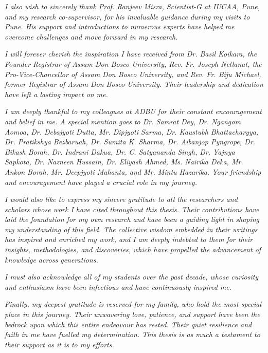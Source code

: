 \begin{titlepage}
    \par\textsl{I also wish to sincerely thank Prof. Ranjeev Misra, Scientist-G at IUCAA, Pune, and my research co-supervisor, for his invaluable guidance during my visits to Pune. His support and introductions to numerous experts have helped me overcome challenges and move forward in my research.}
    
    \par\textsl{I will forever cherish the inspiration I have received from Dr. Basil Koikara, the Founder Registrar of Assam Don Bosco University, Rev. Fr. Joseph Nellanat, the Pro-Vice-Chancellor of Assam Don Bosco University, and Rev. Fr. Biju Michael, former Registrar of Assam Don Bosco University. Their leadership and dedication have left a lasting impact on me.}
    
    \par\textsl{I am deeply thankful to my colleagues at ADBU for their constant encouragement and belief in me. A special mention goes to Dr. Samrat Dey, Dr. Ngangom Aomoa, Dr. Debajyoti Dutta, Mr. Dipjyoti Sarma, Dr. Kaustubh Bhattacharyya, Dr. Pratikshya Bezbaruah, Dr. Sumita K. Sharma, Dr. Aibanjop Pyngrope, Dr. Bikash Borah, Dr. Indrani Dakua, Dr. C. Satyananda Singh, Dr. Yajnya Sapkota, Dr. Nazneen Hussain, Dr. Eliyash Ahmed, Ms. Nairika Deka, Mr. Ankon Borah, Mr. Deepjyoti Mahanta, and Mr. Mintu Hazarika. Your friendship and encouragement have played a crucial role in my journey.}
    
    \par\textsl{I would also like to express my sincere gratitude to all the researchers and scholars whose work I have cited throughout this thesis. Their contributions have laid the foundation for my own research and have been a guiding light in shaping my understanding of this field. The collective wisdom embedded in their writings has inspired and enriched my work, and I am deeply indebted to them for their insights, methodologies, and discoveries, which have propelled the advancement of knowledge across generations.}
    
    \par\textsl{I must also acknowledge all of my students over the past decade, whose curiosity and enthusiasm have been infectious and have continuously inspired me.}
    
    \par\textsl{Finally, my deepest gratitude is reserved for my family, who hold the most special place in this journey. Their unwavering love, patience, and support have been the bedrock upon which this entire endeavour has rested. Their quiet resilience and faith in me have fuelled my determination. This thesis is as much a testament to their support as it is to my efforts.}
    

\end{titlepage}
